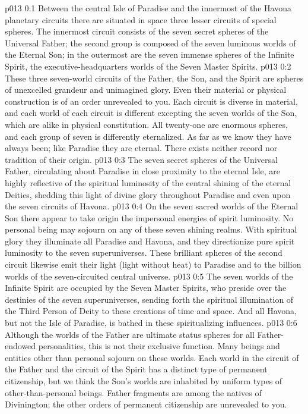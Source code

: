 \author{Perfector of Wisdom}
\vs p013 0:1 Between the central Isle of Paradise and the innermost of the Havona planetary circuits there are situated in space three lesser circuits of special spheres. The innermost circuit consists of the seven secret spheres of the Universal Father; the second group is composed of the seven luminous worlds of the Eternal Son; in the outermost are the seven immense spheres of the Infinite Spirit, the executive\hyp{}headquarters worlds of the Seven Master Spirits.
\vs p013 0:2 These three seven\hyp{}world circuits of the Father, the Son, and the Spirit are spheres of unexcelled grandeur and unimagined glory. Even their material or physical construction is of an order unrevealed to you. Each circuit is diverse in material, and each world of each circuit is different excepting the seven worlds of the Son, which are alike in physical constitution. All twenty\hyp{}one are enormous spheres, and each group of seven is differently eternalized. As far as we know they have always been; like Paradise they are eternal. There exists neither record nor tradition of their origin.
\pc \vs p013 0:3 The seven secret spheres of the Universal Father, circulating about Paradise in close proximity to the eternal Isle, are highly reflective of the spiritual luminosity of the central shining of the eternal Deities, shedding this light of divine glory throughout Paradise and even upon the seven circuits of Havona.
\pc \vs p013 0:4 On the seven sacred worlds of the Eternal Son there appear to take origin the impersonal energies of spirit luminosity. No personal being may sojourn on any of these seven shining realms. With spiritual glory they illuminate all Paradise and Havona, and they directionize pure spirit luminosity to the seven superuniverses. These brilliant spheres of the second circuit likewise emit their light (light without heat) to Paradise and to the billion worlds of the seven\hyp{}circuited central universe.
\pc \vs p013 0:5 The seven worlds of the Infinite Spirit are occupied by the Seven Master Spirits, who preside over the destinies of the seven superuniverses, sending forth the spiritual illumination of the Third Person of Deity to these creations of time and space. And all Havona, but not the Isle of Paradise, is bathed in these spiritualizing influences.
\pc \vs p013 0:6 Although the worlds of the Father are ultimate status spheres for all Father\hyp{}endowed personalities, this is not their exclusive function. Many beings and entities other than personal sojourn on these worlds. Each world in the circuit of the Father and the circuit of the Spirit has a distinct type of permanent citizenship, but we think the Son’s worlds are inhabited by uniform types of other\hyp{}than\hyp{}personal beings. Father fragments are among the natives of Divinington; the other orders of permanent citizenship are unrevealed to you.
